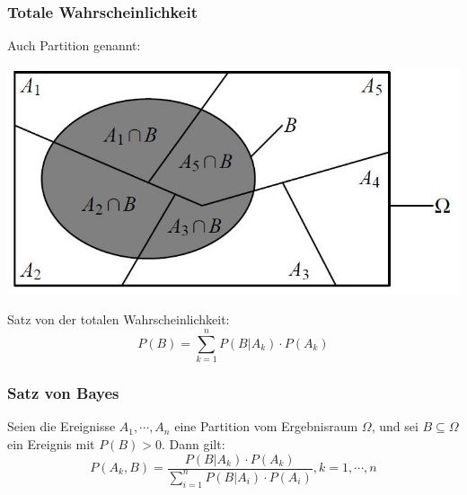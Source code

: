 \documentclass[12pt,a4paper]{article} %
\begin{document}
\subsubsection{Totale Wahrscheinlichkeit}
Auch Partition genannt:
\begin{center}
\includegraphics[scale=0.5]{partition.jpg}
\end{center}
Satz von der totalen Wahrscheinlichkeit:
$$P(B)=\sum_{k=1}^n P(B|A_k)\cdot P(A_k)$$

\subsubsection{Satz von Bayes}
Seien die Ereignisse $A_1,\cdots ,A_n$ eine Partition vom Ergebnisraum $\Omega$, und sei $B \subseteq \Omega$ ein Ereignis mit $P(B) > 0$. Dann gilt:
$$P(A_k,B) = \frac{P(B|A_k)\cdot P(A_k)}{\sum_{i=1}^n P(B|A_i)\cdot P(A_i)}, k=1,\cdots,n$$
\end{document}
